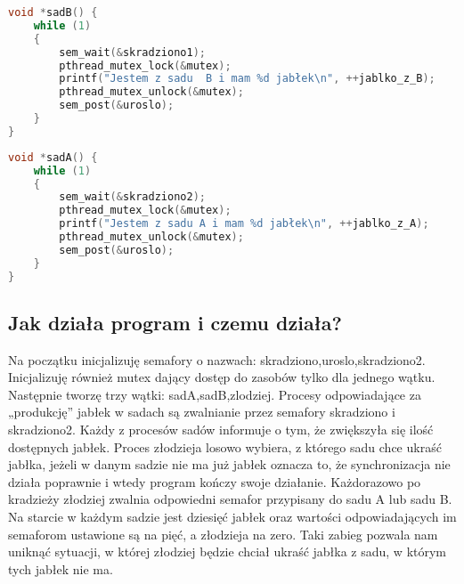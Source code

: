 \documentclass[10pt,a4paper]{article}
\begin{document}
\begin{lstlisting}[language=C,caption=Funkcja odpowiadająca za sad "B",basicstyle=\small]
void *sadB() {
    while (1)
    {
        sem_wait(&skradziono1);
        pthread_mutex_lock(&mutex);
        printf("Jestem z sadu  B i mam %d jabłek\n", ++jablko_z_B);
        pthread_mutex_unlock(&mutex);
        sem_post(&uroslo);
    }
}
\end{lstlisting}

\begin{lstlisting}[language=C,caption=Funkcja odpowiadająca za sad "A",basicstyle=\small]
void *sadA() {
    while (1)
    {
        sem_wait(&skradziono2);
        pthread_mutex_lock(&mutex);
        printf("Jestem z sadu A i mam %d jabłek\n", ++jablko_z_A);
        pthread_mutex_unlock(&mutex);
        sem_post(&uroslo);
    }
}
\end{lstlisting}

\subsection{Jak działa program i czemu działa?}
Na początku inicjalizuję semafory o nazwach: skradziono,uroslo,skradziono2. Inicjalizuję również mutex dający dostęp do zasobów tylko dla jednego wątku.
Następnie tworzę trzy wątki: sadA,sadB,zlodziej. Procesy odpowiadające
za „produkcję” jabłek w sadach są zwalnianie przez semafory skradziono i
skradziono2. Każdy z procesów sadów informuje o tym, że zwiększyła się ilość
dostępnych jabłek. Proces złodzieja losowo wybiera, z którego sadu chce ukraść
jabłka, jeżeli w danym sadzie nie ma już jabłek oznacza to, że synchronizacja nie
działa poprawnie i wtedy program kończy swoje działanie. Każdorazowo po 
kradzieży złodziej zwalnia odpowiedni semafor przypisany do sadu A lub sadu B.
Na starcie w każdym sadzie jest dziesięć jabłek oraz wartości odpowiadających
im semaforom ustawione są na pięć, a złodzieja na zero. Taki zabieg pozwala
nam uniknąć sytuacji, w której złodziej będzie chciał ukraść jabłka z sadu, w
którym tych jabłek nie ma.
\end{document}
